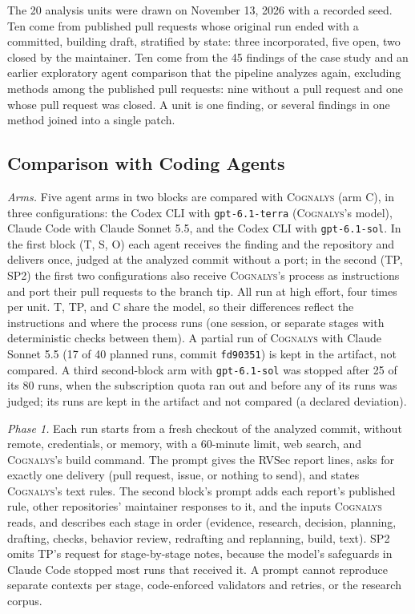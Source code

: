 \documentclass[conference]{IEEEtran}
\newcommand{\system}{\textsc{Cognalys}}
\begin{document}
The 20 analysis units were drawn on November 13, 2026 with a recorded seed.
Ten come from published pull requests whose original run ended with a
committed, building draft, stratified by state: three incorporated, five
open, two closed by the maintainer. Ten come from the 45 findings of the case
study and an earlier exploratory agent comparison that the pipeline analyzes
again, excluding methods among the published pull requests: nine without a
pull request and one whose pull request was closed. A unit is one finding, or
several findings in one method joined into a single patch.

\subsection{Comparison with Coding Agents}
\label{subsec:protocol}

\emph{Arms.} Five agent arms in two blocks are compared with {\system} (arm
C), in three configurations: the Codex CLI with \texttt{gpt-6.1-terra}
({\system}'s model), Claude Code with Claude Sonnet 5.5, and the Codex CLI
with \texttt{gpt-6.1-sol}. In the first block (T, S, O) each agent receives
the finding and the repository and delivers once, judged at the analyzed
commit without a port; in the second (TP, SP2) the first two configurations
also receive {\system}'s process as instructions and port their pull requests
to the branch tip. All run at high effort, four times per unit. T, TP, and C
share the model, so their differences reflect the instructions and where the
process runs (one session, or separate stages with deterministic checks
between them). A partial run of {\system} with Claude Sonnet 5.5 (17 of 40
planned runs, commit \texttt{fd90351}) is kept in the artifact, not compared.
A third second-block arm with \texttt{gpt-6.1-sol} was stopped after 25 of
its 80 runs, when the subscription quota ran out and before any of its runs
was judged; its runs are kept in the artifact and not compared (a declared
deviation).

\emph{Phase 1.} Each run starts from a fresh checkout of the analyzed commit,
without remote, credentials, or memory, with a 60-minute limit, web search,
and {\system}'s build command. The prompt gives the RVSec report lines, asks
for exactly one delivery (pull request, issue, or nothing to send), and states
{\system}'s text rules. The second block's prompt adds each report's published
rule, other repositories' maintainer responses to it, and the inputs {\system}
reads, and describes each stage in order (evidence, research, decision,
planning, drafting, checks, behavior review, redrafting and replanning, build,
text). SP2 omits TP's request for stage-by-stage notes, because the
model's safeguards in Claude Code stopped most runs that received it. A prompt
cannot reproduce separate contexts per stage, code-enforced validators and
retries, or the research corpus.
\end{document}
